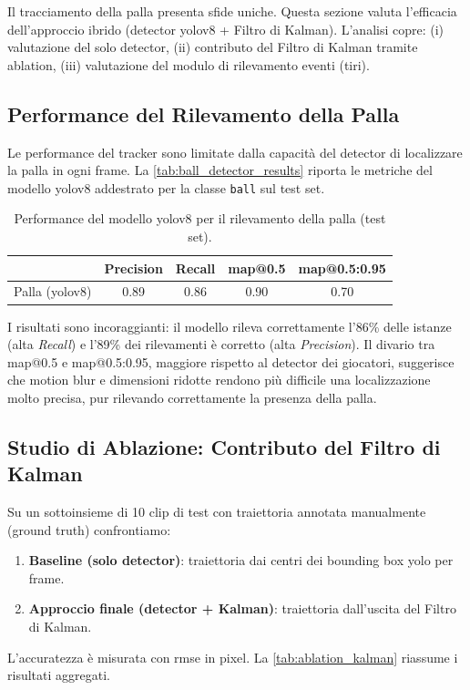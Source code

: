 \documentclass[12pt,a4paper,openright,twoside]{book}
\begin{document}
Il tracciamento della palla presenta sfide uniche. 
Questa sezione valuta l'efficacia dell'approccio ibrido
(detector \ac{yolo}v8 + Filtro di Kalman). 
L'analisi copre: (i) valutazione del solo detector, 
(ii) contributo del Filtro di Kalman tramite ablation,
(iii) valutazione del modulo di rilevamento eventi (tiri).

\subsection{Performance del Rilevamento della Palla}
\label{sec:ball_detection_performance}

Le performance del tracker sono limitate dalla capacità 
del detector di localizzare la palla in ogni frame.
La \autoref{tab:ball_detector_results} riporta le 
metriche del modello \ac{yolo}v8 addestrato per la 
classe \texttt{ball} sul test set.

\begin{table}[t]
  \centering
  \caption{Performance del modello 
  \ac{yolo}v8 per il rilevamento della palla (test set).}
  \label{tab:ball_detector_results}
  \begin{tabular}{l S[table-format=1.2] S[table-format=1.2] 
    S[table-format=1.2] S[table-format=1.2]}
    \toprule
    & {\textbf{Precision}} & {\textbf{Recall}} 
    & {\textbf{\ac{map}@0.5}} & {\textbf{\ac{map}@0.5:0.95}} \\
    \midrule
    Palla (\ac{yolo}v8) & 0.89 & 0.86 & 0.90 & 0.70 \\
    \bottomrule
  \end{tabular}
\end{table}

I risultati sono incoraggianti: il modello rileva correttamente 
l'86\% delle istanze (alta \emph{Recall}) e l'89\% 
dei rilevamenti è corretto (alta \emph{Precision}).
Il divario tra \ac{map}@0.5 e \ac{map}@0.5:0.95, 
maggiore rispetto al detector dei giocatori, 
suggerisce che motion blur e dimensioni ridotte 
rendono più difficile una localizzazione molto precisa, 
pur rilevando correttamente la presenza della palla.

\subsection{Studio di Ablazione: Contributo del Filtro di Kalman}

Su un sottoinsieme di 10 clip di test con traiettoria annotata 
manualmente (ground truth) confrontiamo:
\begin{enumerate}
  \item \textbf{Baseline (solo detector)}: traiettoria 
  dai centri dei bounding box \ac{yolo} per frame.
  \item \textbf{Approccio finale (detector + Kalman)}: 
  traiettoria dall'uscita del Filtro di Kalman.
\end{enumerate}
L'accuratezza è misurata con \ac{rmse} in pixel. 
La \autoref{tab:ablation_kalman} riassume i risultati aggregati.
\end{document}
